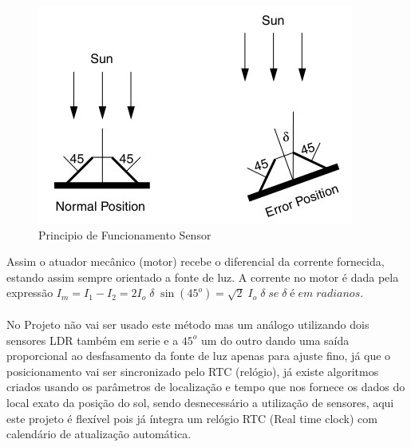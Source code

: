 \begin{figure}[H]
	\centering
	\includegraphics[scale=0.52]{./image/Sensor_Actuator_Principle.jpg}
	\caption{Principio de Funcionamento Sensor \cite{book_2}}
\end{figure}
Assim o atuador mecânico (motor) recebe o diferencial da corrente fornecida, estando assim sempre orientado a fonte de luz. A corrente no motor é dada pela expressão \; $I_m = I_1 - I_2 = 2 I_o \; \delta \; \sin (45^o) = \sqrt{2} \; I_o \; \delta \; se \; \delta \; é \; em \; radianos$. \cite{book_2} \\
\\
No Projeto não vai ser usado este método mas um análogo utilizando dois sensores LDR também em serie e a $45^o$ um do outro dando uma saída proporcional ao desfasamento da fonte de luz apenas para ajuste fino, já que o posicionamento vai ser sincronizado pelo RTC (relógio), já existe algoritmos criados usando os parâmetros de localização e tempo que nos fornece os dados do local exato da posição do sol, sendo desnecessário a utilização de sensores, aqui este projeto é flexível pois já íntegra um relógio RTC (Real time clock) com calendário de atualização automática.
\newpage
